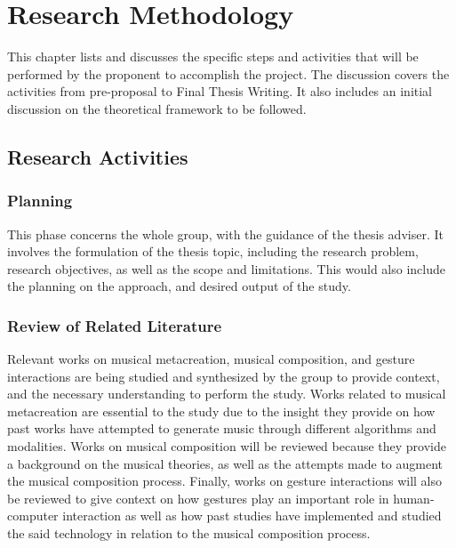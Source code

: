 \section{Research Methodology}
This chapter lists and discusses the specific steps and activities that will be performed by the proponent to accomplish the project. 
The discussion covers the activities from pre-proposal to Final Thesis Writing.  It also includes an initial discussion on the theoretical
framework to be followed.

\subsection{Research Activities}

\subsubsection{Planning}
This phase concerns the whole group, with the guidance of the thesis adviser. It involves the formulation of the thesis topic, including the research problem, research objectives, as well as the scope and limitations. This would also include the planning on the approach, and desired output of the study. 

\subsubsection{Review of Related Literature}
Relevant works on musical metacreation, musical composition, and gesture interactions are being studied and synthesized by the group to provide context, and the necessary understanding to perform the study. Works related to musical metacreation are essential to the study due to the insight they provide on how past works have attempted to generate music through different algorithms and modalities. Works on musical composition will be reviewed because they provide a background on the musical theories, as well as the attempts made to augment the musical composition process. Finally, works on gesture interactions will also be reviewed to give context on how gestures play an important role in human-computer interaction as well as how past studies have implemented and studied the said technology in relation to the musical composition process.

